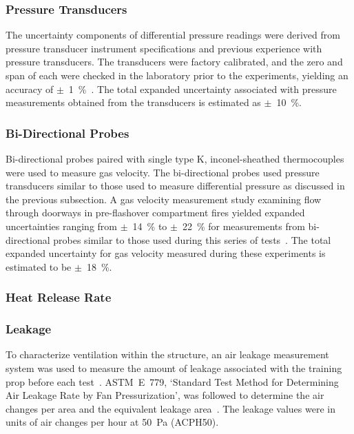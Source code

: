 \documentclass[12pt,oneside]{book}
\begin{document}

\subsubsection*{Pressure Transducers}
The uncertainty components of differential pressure readings were derived from pressure transducer instrument specifications and previous experience with pressure transducers. The transducers were factory calibrated, and the zero and span of each were checked in the laboratory prior to the experiments, yielding an accuracy of $\pm$~1~\%~\cite{Setra:2002}. The total expanded uncertainty associated with pressure measurements obtained from the transducers is estimated as $\pm$~10~\%.

\subsubsection*{Bi-Directional Probes}
Bi-directional probes paired with single type K, inconel-sheathed thermocouples were used to measure gas velocity. The bi-directional probes used pressure transducers similar to those used to measure differential pressure as discussed in the previous subsection. A gas velocity measurement study examining flow through doorways in pre-flashover compartment fires yielded expanded uncertainties ranging from $\pm$~14~\% to $\pm$~22~\% for measurements from bi-directional probes similar to those used during this series of tests~\cite{Bryant:FSJ2009}. The total expanded uncertainty for gas velocity measured during these experiments is estimated to be $\pm$~18~\%. 

\subsubsection*{Heat Release Rate}

\subsubsection*{Leakage} 
To characterize ventilation within the structure, an air leakage measurement system was used to measure the amount of leakage associated with the training prop before each test~\cite{retrotec:leakage}. ASTM~E~779, `Standard Test Method for Determining Air Leakage Rate by Fan Pressurization', was followed to determine the air changes per area and the equivalent leakage area~\cite{astm_e779}. The leakage values were in units of air changes per hour at 50~Pa (ACPH50). 
\end{document}
